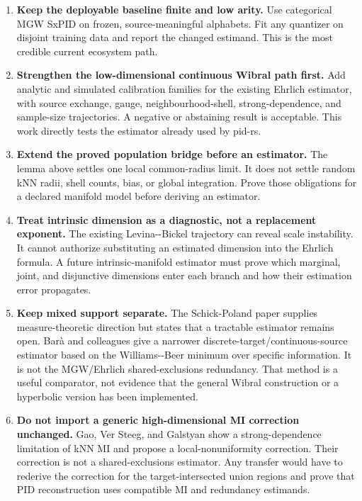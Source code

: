 \documentclass[
  11pt,
  a4paper,
]{article}
\providecommand{\tightlist}{%
  \setlength{\itemsep}{0pt}\setlength{\parskip}{0pt}}
\begin{document}
\begin{enumerate}
\def\labelenumi{\arabic{enumi}.}
\tightlist
\item
  \textbf{Keep the deployable baseline finite and low arity.} Use
  categorical MGW SxPID on frozen, source-meaningful alphabets. Fit any
  quantizer on disjoint training data and report the changed estimand.
  This is the most credible current ecosystem path.
\item
  \textbf{Strengthen the low-dimensional continuous Wibral path first.}
  Add analytic and simulated calibration families for the existing
  Ehrlich estimator, with source exchange, gauge, neighbourhood-shell,
  strong-dependence, and sample-size trajectories. A negative or
  abstaining result is acceptable. This work directly tests the
  estimator already used by pid-rs.
\item
  \textbf{Extend the proved population bridge before an estimator.} The
  lemma above settles one local common-radius limit. It does not settle
  random kNN radii, shell counts, bias, or global integration. Prove
  those obligations for a declared manifold model before deriving an
  estimator.
\item
  \textbf{Treat intrinsic dimension as a diagnostic, not a replacement
  exponent.} The existing Levina-\/-Bickel trajectory can reveal scale
  instability. It cannot authorize substituting an estimated dimension
  into the Ehrlich formula. A future intrinsic-manifold estimator must
  prove which marginal, joint, and disjunctive dimensions enter each
  branch and how their estimation error propagates.
\item
  \textbf{Keep mixed support separate.} The Schick-Poland paper supplies
  measure-theoretic direction but states that a tractable estimator
  remains open. Barà and colleagues give a narrower
  discrete-target/continuous-source estimator based on the
  Williams-\/-Beer minimum over specific information. It is not the
  MGW/Ehrlich shared-exclusions redundancy. That method is a useful
  comparator, not evidence that the general Wibral construction or a
  hyperbolic version has been implemented.
\item
  \textbf{Do not import a generic high-dimensional MI correction
  unchanged.} Gao, Ver Steeg, and Galstyan show a strong-dependence
  limitation of kNN MI and propose a local-nonuniformity correction.
  Their correction is not a shared-exclusions estimator. Any transfer
  would have to rederive the correction for the target-intersected union
  regions and prove that PID reconstruction uses compatible MI and
  redundancy estimands.
\end{enumerate}
\end{document}
